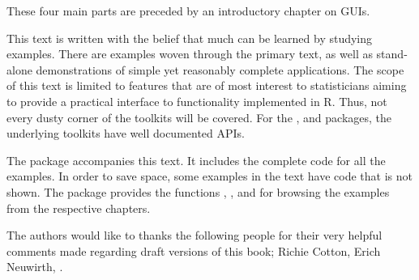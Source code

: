 These four main parts are preceded by an introductory chapter on GUIs.

This text is written with the belief that much can be learned by
studying examples. There are examples woven through the primary text,
as well as stand-alone demonstrations of simple yet reasonably
complete applications. The scope of this text is limited to features
that are of most interest to statisticians aiming to provide a
practical interface to functionality implemented in R. Thus, not every
dusty corner of the toolkits will be covered. For the ,
 and  packages, the underlying toolkits have
well documented APIs.

The package \pkg{\PACKAGENAME} accompanies this text. It includes the
complete code for all the examples. In order to save space, some
examples in the text have code that is not shown. The package provides
the functions , ,
 and  for browsing the
examples from the respective chapters. 


The authors would like to thanks the following people for their very
helpful comments made regarding draft versions of this book; Richie
Cotton, Erich Neuwirth, .



